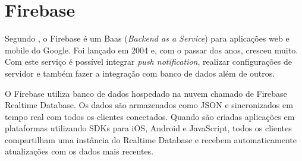 \section{Firebase}
Segundo , o Firebase é um Baas (\textit{Backend as a Service}) para aplicações web e mobile do Google. Foi lançado em 2004 e, com o passar dos anos, cresceu muito. Com este serviço é possível integrar \textit{push notification}, realizar configurações de servidor e também fazer a integração com banco de dados além de outros.

O Firebase utiliza banco de dados hospedado na nuvem chamado de Firebase Realtime Database. Os dados são armazenados como JSON e sincronizados em tempo real com todos os clientes conectados. Quando são criadas aplicações em plataformas utilizando SDKs para iOS, Android e JavaScript, todos os clientes compartilham uma instância do Realtime Database e recebem automaticamente atualizações com os dados mais recentes.  \cite{firebase1} 









